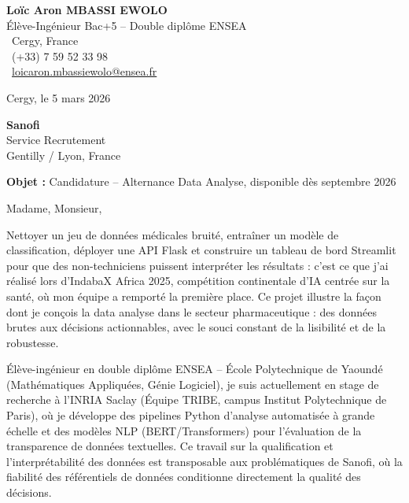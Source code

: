 \documentclass[a4paper,11pt]{article}
\begin{document}
\noindent
\begin{minipage}[t]{0.5\textwidth}
    \textbf{Loïc Aron MBASSI EWOLO}\\
    Élève-Ingénieur Bac+5 -- Double diplôme ENSEA\\[3pt]
    \faMapMarker\ Cergy, France\\
    \faPhone\ (+33) 7 59 52 33 98\\
    \faEnvelope\ \href{mailto:loicaron.mbassiewolo@ensea.fr}{loicaron.mbassiewolo@ensea.fr}
\end{minipage}
\hfill
\begin{minipage}[t]{0.4\textwidth}
    \raggedleft
    Cergy, le 5 mars 2026
\end{minipage}

\vspace{1.2cm}

\hfill
\begin{minipage}[t]{0.5\textwidth}
    \raggedleft
    \textbf{Sanofi}\\
    Service Recrutement\\
    Gentilly / Lyon, France
\end{minipage}

\vspace{1cm}

\noindent\textbf{Objet :} Candidature -- Alternance Data Analyse, disponible dès septembre 2026

\vspace{0.8cm}

Madame, Monsieur,

Nettoyer un jeu de données médicales bruité, entraîner un modèle de classification, déployer une API Flask et construire un tableau de bord Streamlit pour que des non-techniciens puissent interpréter les résultats : c'est ce que j'ai réalisé lors d'IndabaX Africa 2025, compétition continentale d'IA centrée sur la santé, où mon équipe a remporté la première place. Ce projet illustre la façon dont je conçois la data analyse dans le secteur pharmaceutique : des données brutes aux décisions actionnables, avec le souci constant de la lisibilité et de la robustesse.

Élève-ingénieur en double diplôme ENSEA -- École Polytechnique de Yaoundé (Mathématiques Appliquées, Génie Logiciel), je suis actuellement en stage de recherche à l'INRIA Saclay (Équipe TRIBE, campus Institut Polytechnique de Paris), où je développe des pipelines Python d'analyse automatisée à grande échelle et des modèles NLP (BERT/Transformers) pour l'évaluation de la transparence de données textuelles. Ce travail sur la qualification et l'interprétabilité des données est transposable aux problématiques de Sanofi, où la fiabilité des référentiels de données conditionne directement la qualité des décisions.
\end{document}
